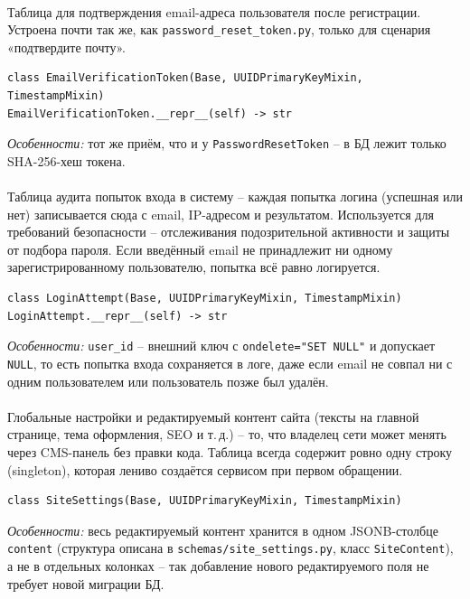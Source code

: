 \paragraph{}
Таблица для подтверждения email-адреса пользователя после регистрации.
Устроена почти так же, как \texttt{password_reset_token.py}, только для
сценария «подтвердите почту».
\begin{verbatim}
class EmailVerificationToken(Base, UUIDPrimaryKeyMixin, TimestampMixin)
EmailVerificationToken.__repr__(self) -> str
\end{verbatim}
\textit{Особенности:} тот же приём, что и у \texttt{PasswordResetToken} --
в БД лежит только SHA-256-хеш токена.

\paragraph{}
Таблица аудита попыток входа в систему -- каждая попытка логина
(успешная или нет) записывается сюда с email, IP-адресом и результатом.
Используется для требований безопасности -- отслеживания подозрительной
активности и защиты от подбора пароля. Если введённый email не
принадлежит ни одному зарегистрированному пользователю, попытка всё
равно логируется.
\begin{verbatim}
class LoginAttempt(Base, UUIDPrimaryKeyMixin, TimestampMixin)
LoginAttempt.__repr__(self) -> str
\end{verbatim}
\textit{Особенности:} \texttt{user_id} -- внешний ключ с
\texttt{ondelete="SET NULL"} и допускает \texttt{NULL}, то есть попытка
входа сохраняется в логе, даже если email не совпал ни с одним
пользователем или пользователь позже был удалён.

\paragraph{}
Глобальные настройки и редактируемый контент сайта (тексты на главной
странице, тема оформления, SEO и т.\,д.) -- то, что владелец сети может
менять через CMS-панель без правки кода. Таблица всегда содержит ровно
одну строку (singleton), которая лениво создаётся сервисом при первом
обращении.
\begin{verbatim}
class SiteSettings(Base, UUIDPrimaryKeyMixin, TimestampMixin)
\end{verbatim}
\textit{Особенности:} весь редактируемый контент хранится в одном
JSONB-столбце \texttt{content} (структура описана в
\texttt{schemas/site_settings.py}, класс \texttt{SiteContent}), а не в
отдельных колонках -- так добавление нового редактируемого поля не
требует новой миграции БД.

